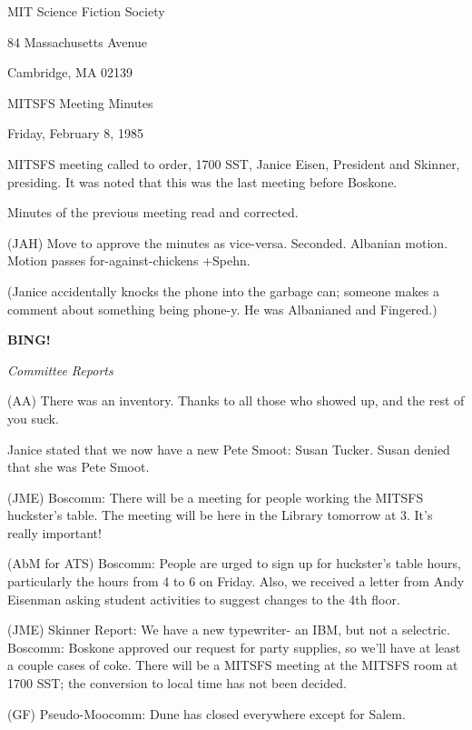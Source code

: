 \documentclass[12pt]{article}
\newcommand{\bing}{{\bf BING!} }
\newcommand{\goto}[1]{\bing \vskip 12pt \centerline{{\em{#1}}}}
\begin{document}
\begin{center}

MIT Science Fiction Society 

84 Massachusetts Avenue

Cambridge, MA 02139

\vspace{12pt}

MITSFS Meeting Minutes 

Friday, February 8, 1985

\end{center}
 
\vspace{18pt}

\setlength{\parskip}{6pt}

\noindent
MITSFS meeting called to order, 1700 SST,
Janice Eisen, President and Skinner, presiding. It was noted that this was the last meeting before Boskone.

Minutes of the previous meeting read and corrected.

(JAH) Move to approve the minutes as vice-versa. Seconded. Albanian motion. Motion passes for-against-chickens +Spehn.

(Janice accidentally knocks the phone into the garbage can; someone makes a comment about something being phone-y. He was Albanianed and Fingered.)

\goto{Committee Reports}

(AA) There was an inventory. Thanks to all those who showed up, and the rest of you suck.

Janice stated that we now have a new Pete Smoot: Susan Tucker. Susan denied that she was Pete Smoot.

(JME) Boscomm: There will be a meeting for people working the MITSFS huckster's table. The meeting will be here in the Library tomorrow at 3. It's really important!

(AbM for ATS) Boscomm: People are urged to sign up for huckster's table hours, particularly the hours from 4 to 6 on Friday. Also, we received a letter from Andy Eisenman asking student activities to suggest changes to the 4th floor.

(JME) Skinner Report: We have a new typewriter- an IBM, but not a selectric. Boscomm: Boskone approved our request for party supplies, so we'll have at least a couple cases of coke. There will be a MITSFS meeting at the MITSFS room at 1700 SST; the conversion to local time has not been decided.

(GF) Pseudo-Moocomm: Dune has closed everywhere except for Salem.
\end{document}
